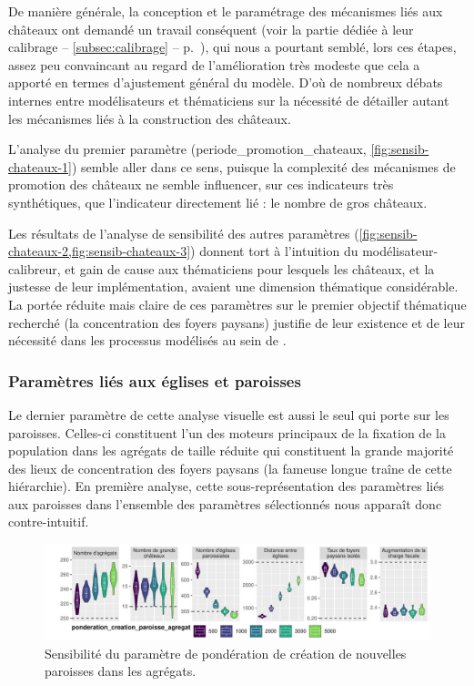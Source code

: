 De manière générale, la conception et le paramétrage des mécanismes liés aux châteaux ont demandé un travail conséquent (voir la partie dédiée à leur calibrage -- \cref{subsec:calibrage} -- p.~\pageref{subsubsec:calibrage-chateaux}), qui nous a pourtant semblé, lors ces étapes, assez peu convaincant au regard de l'amélioration très modeste que cela a apporté en termes d'ajustement général du modèle.
D'où de nombreux débats internes entre modélisateurs et thématiciens sur la nécessité de détailler autant les mécanismes liés à la construction des châteaux.

L'analyse du premier paramètre (\textsf{periode\_promotion\_chateaux}, \cref{fig:sensib-chateaux-1}) semble aller dans ce sens, puisque la complexité des mécanismes de promotion des châteaux ne semble influencer, sur ces indicateurs très synthétiques, que l'indicateur directement lié : le nombre de gros châteaux.

Les résultats de l'analyse de sensibilité des autres paramètres (\cref{fig:sensib-chateaux-2,fig:sensib-chateaux-3}) donnent tort à l'intuition du modélisateur-\og calibreur\fg{}, et gain de cause aux thématiciens pour lesquels les châteaux, et la justesse de leur implémentation, avaient une dimension thématique considérable.
La portée réduite mais claire de ces paramètres sur le premier objectif thématique recherché (la concentration des foyers paysans) justifie de leur existence et de leur nécessité dans les processus modélisés au sein de \simfeodal{}.

\subsubsection{Paramètres liés aux églises et paroisses}

Le dernier paramètre de cette analyse visuelle est aussi le seul qui porte sur les paroisses.
Celles-ci constituent l'un des moteurs principaux de la fixation de la population dans les agrégats de taille réduite qui constituent la grande majorité des lieux de concentration des foyers paysans (la fameuse \og longue traîne\fg{} de cette hiérarchie).
En première analyse, cette sous-représentation des paramètres liés aux paroisses dans l'ensemble des paramètres sélectionnés nous apparaît donc contre-intuitif.

\begin{figure}[H]
	\centering
	\includegraphics[width=\linewidth]{img/sensib/sensibilite_ponderation_creation_paroisse_agregat.pdf}
	\caption{Sensibilité du paramètre de pondération de création de nouvelles paroisses dans les agrégats.}
	\label{fig:sensib-paroisses}
\end{figure}

